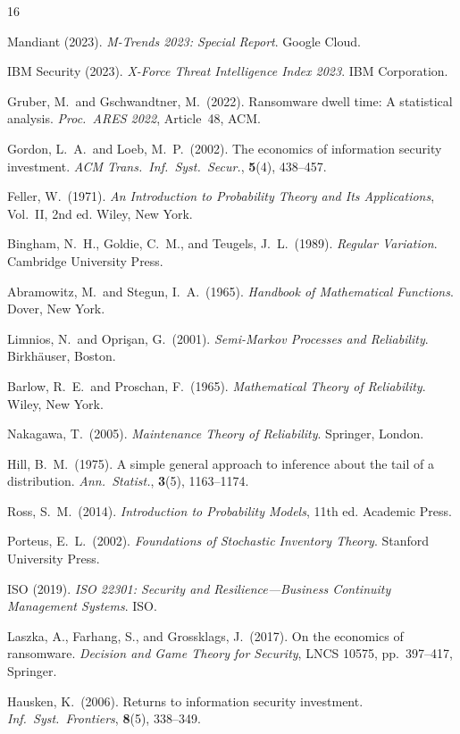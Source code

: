 \documentclass[12pt,a4paper]{article}
\theoremstyle{plain}
\theoremstyle{definition}
\theoremstyle{remark}
\begin{document}
\begin{thebibliography}{16}

Mandiant (2023). \textit{M-Trends 2023: Special Report}. Google Cloud.

IBM Security (2023). \textit{X-Force Threat Intelligence Index 2023}. IBM Corporation.

Gruber, M.\ and Gschwandtner, M.\ (2022).
Ransomware dwell time: A statistical analysis.
\textit{Proc.\ ARES 2022}, Article~48, ACM.

Gordon, L.\ A.\ and Loeb, M.\ P.\ (2002).
The economics of information security investment.
\textit{ACM Trans.\ Inf.\ Syst.\ Secur.}, \textbf{5}(4), 438--457.

Feller, W.\ (1971).
\textit{An Introduction to Probability Theory and Its Applications},
Vol.~II, 2nd ed. Wiley, New York.

Bingham, N.\ H., Goldie, C.\ M., and Teugels, J.\ L.\ (1989).
\textit{Regular Variation}. Cambridge University Press.

Abramowitz, M.\ and Stegun, I.\ A.\ (1965).
\textit{Handbook of Mathematical Functions}. Dover, New York.

Limnios, N.\ and Opri\c{s}an, G.\ (2001).
\textit{Semi-Markov Processes and Reliability}. Birkh\"{a}user, Boston.

Barlow, R.\ E.\ and Proschan, F.\ (1965).
\textit{Mathematical Theory of Reliability}. Wiley, New York.

Nakagawa, T.\ (2005).
\textit{Maintenance Theory of Reliability}. Springer, London.

Hill, B.\ M.\ (1975).
A simple general approach to inference about the tail of a distribution.
\textit{Ann.\ Statist.}, \textbf{3}(5), 1163--1174.

Ross, S.\ M.\ (2014).
\textit{Introduction to Probability Models}, 11th ed. Academic Press.

Porteus, E.\ L.\ (2002).
\textit{Foundations of Stochastic Inventory Theory}. Stanford University Press.

ISO (2019). \textit{ISO 22301: Security and Resilience---Business Continuity Management Systems}. ISO.

Laszka, A., Farhang, S., and Grossklags, J.\ (2017).
On the economics of ransomware.
\textit{Decision and Game Theory for Security}, LNCS 10575, pp.~397--417, Springer.

Hausken, K.\ (2006).
Returns to information security investment.
\textit{Inf.\ Syst.\ Frontiers}, \textbf{8}(5), 338--349.

\end{thebibliography}
\end{document}
